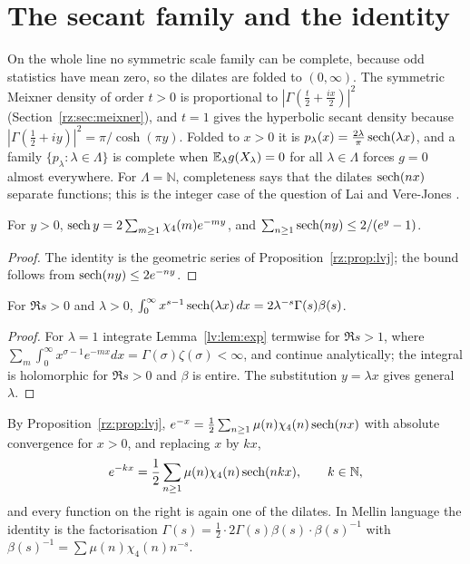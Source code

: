 \section{The secant family and the identity}\label{lv:sec:identity}

On the whole line no symmetric scale family can be complete, because odd statistics have mean zero, so the dilates are folded to $(0,\infty)$. The symmetric Meixner density of order $t>0$ is proportional to $|\Gamma(\frac t2+\frac{ix}2)|^2$ (Section~\ref{rz:sec:meixner}), and $t=1$ gives the hyperbolic secant density because $|\Gamma(\frac12+iy)|^2=\pi/\cosh(\pi y)$. Folded to $x>0$ it is $p_\lambda(x)=\frac{2\lambda}\pi\operatorname{sech}(\lambda x)$, and a family $\{p_\lambda:\lambda\in\Lambda\}$ is complete when $\mathbb{E}_\lambda g(X_\lambda)=0$ for all $\lambda\in\Lambda$ forces $g=0$ almost everywhere. For $\Lambda=\mathbb N$, completeness says that the dilates $\operatorname{sech}(nx)$ separate functions; this is the integer case of the question of Lai and Vere-Jones \cite{LVJ}.

\begin{lemma}\label{lv:lem:exp}
For $y>0$, $\operatorname{sech} y=2\sum_{m\ge1}\chi_4(m)e^{-my}$, and $\sum_{n\ge1}\operatorname{sech}(ny)\le2/(e^y-1)$.
\end{lemma}

\begin{proof}
The identity is the geometric series of Proposition~\ref{rz:prop:lvj}; the bound follows from $\operatorname{sech}(ny)\le2e^{-ny}$.
\end{proof}

\begin{lemma}\label{lv:lem:mellin}
For $\Re s>0$ and $\lambda>0$, $\int_0^\infty x^{s-1}\operatorname{sech}(\lambda x)\,dx=2\lambda^{-s}\Gamma(s)\beta(s)$.
\end{lemma}

\begin{proof}
For $\lambda=1$ integrate Lemma~\ref{lv:lem:exp} termwise for $\Re s>1$, where $\sum_m\int_0^\infty x^{\sigma-1}e^{-mx}dx=\Gamma(\sigma)\zeta(\sigma)<\infty$, and continue analytically; the integral is holomorphic for $\Re s>0$ and $\beta$ is entire. The substitution $y=\lambda x$ gives general $\lambda$.
\end{proof}

By Proposition~\ref{rz:prop:lvj}, $e^{-x}=\frac12\sum_{n\ge1}\mu(n)\chi_4(n)\operatorname{sech}(nx)$ with absolute convergence for $x>0$, and replacing $x$ by $kx$,
\begin{equation}\label{lv:eq:LVJk}
e^{-kx}=\frac12\sum_{n\ge1}\mu(n)\chi_4(n)\operatorname{sech}(nkx),\qquad k\in\mathbb N,
\end{equation}
and every function on the right is again one of the dilates. In Mellin language the identity is the factorisation $\Gamma(s)=\frac12\cdot2\Gamma(s)\beta(s)\cdot\beta(s)^{-1}$ with $\beta(s)^{-1}=\sum\mu(n)\chi_4(n)n^{-s}$.

